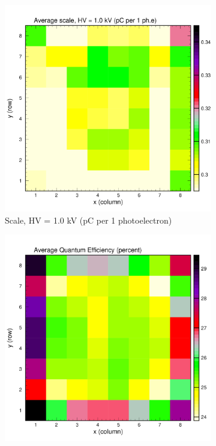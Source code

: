 \begin{figure}[t!]
	\centering
	\begin{subfigure}[c]{0.48\linewidth}
		\centering
		\includegraphics[width=\linewidth, trim={0mm 0mm 0mm 19mm},clip]{figures/pglobal_sc2d.pdf}
		\caption{Scale, HV = 1.0 kV (pC per 1 photoelectron)}
		\vspace{0mm}
	\end{subfigure}%
	\begin{subfigure}[c]{0.48\linewidth}
		\centering
		\includegraphics[width=\linewidth, trim={0mm 0mm 0mm 19mm},clip]{figures/pglobal_qe.pdf}

\end{subfigure}
\end{figure}
